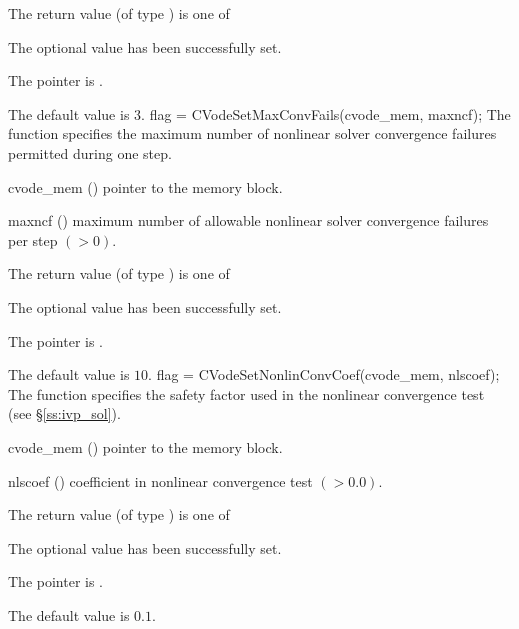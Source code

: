 {
  The return value  (of type ) is one of
  \begin{args}
  \item[\Id{CV\_SUCCESS}] 
    The optional value has been successfully set.
  \item[\Id{CV\_MEM\_NULL}]
    The  pointer is .
  \end{args}
}
{
  The default value is $3$.
}
{
flag = CVodeSetMaxConvFails(cvode\_mem, maxncf);
}
{
  The function  specifies the
  maximum number of nonlinear solver convergence failures permitted during
  one step.
}
{
  \begin{args}
  \item[cvode\_mem] ()
    pointer to the {\cvodes} memory block.
  \item[maxncf] ()
    maximum number of allowable nonlinear solver convergence failures
    per step $( > 0)$.
  \end{args}
}
{
  The return value  (of type ) is one of
  \begin{args}
  \item[\Id{CV\_SUCCESS}] 
    The optional value has been successfully set.
  \item[\Id{CV\_MEM\_NULL}]
    The  pointer is .
  \end{args}
}
{
  The default value is $10$.
}
{
flag = CVodeSetNonlinConvCoef(cvode\_mem, nlscoef);
}
{
  The function  specifies the safety factor used
  in the nonlinear convergence test (see \S\ref{ss:ivp_sol}).
}
{
  \begin{args}
  \item[cvode\_mem] ()
    pointer to the {\cvodes} memory block.
  \item[nlscoef] ()
    coefficient in nonlinear convergence test $( > 0.0)$.
  \end{args}
}
{
  The return value  (of type ) is one of
  \begin{args}
  \item[\Id{CV\_SUCCESS}] 
    The optional value has been successfully set.
  \item[\Id{CV\_MEM\_NULL}]
    The  pointer is .
  \end{args}
}
{
  The default value is $0.1$.
}
